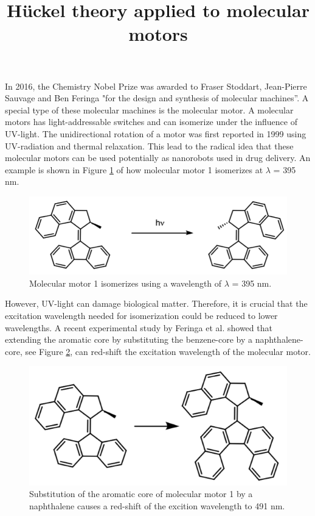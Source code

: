 \documentclass{article}
\begin{document}
\title{H\"uckel theory applied to molecular motors}
\maketitle

In 2016, the Chemistry Nobel Prize was awarded to Fraser Stoddart, Jean-Pierre Sauvage and Ben Feringa "for the design and synthesis of molecular machines”.\cite{nobelprizechemistry2016} A special type of these molecular machines is the molecular motor. A molecular motors has light-addressable switches and can isomerize under the influence of UV-light.\cite{Feringa2012} The unidirectional rotation of a motor was first reported in 1999 using UV-radiation and thermal relaxation.\cite{Koumura1999} This lead to the radical idea that these molecular motors can be used potentially as nanorobots used in drug delivery. An example is shown in Figure \ref{fig:mm1} of how molecular motor 1 isomerizes at $\lambda$ = 395 nm.

\begin{figure}[h]
\centering
\includegraphics[scale=0.75]{./images/scheme1.png}
\caption{Molecular motor 1 isomerizes using a wavelength of $\lambda$ = 395 nm.}
\label{fig:mm1}
\end{figure} 

However, UV-light can damage biological matter. Therefore, it is crucial that the excitation wavelength needed for isomerization could be reduced to lower wavelengths. A recent experimental study by Feringa et al. showed that extending the aromatic core by substituting the benzene-core by a naphthalene-core, see Figure \ref{fig:mm2}, can red-shift the excitation wavelength of the molecular motor.\cite{VanLeeuwen2017} 

\begin{figure}[h]
\centering
\includegraphics[scale=0.75]{./images/scheme2.png}
\caption{Substitution of the aromatic core of molecular motor 1 by a naphthalene causes a red-shift of the excition wavelength to 491 nm.}
\label{fig:mm2}
\end{figure} 
\end{document}
